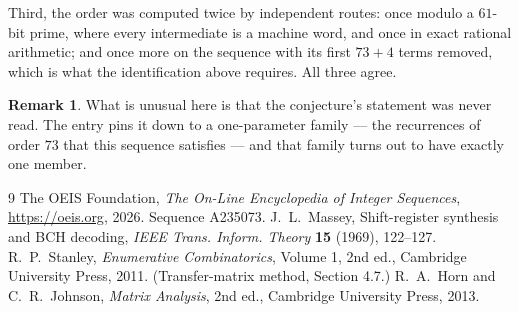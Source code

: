 \documentclass[11pt,a4paper]{article}
\theoremstyle{plain}
\theoremstyle{definition}
\newtheorem{remark}[theorem]{Remark}
\begin{document}
Third, the order was computed twice by independent routes: once modulo a $61$-bit prime, where
every intermediate is a machine word, and once in exact rational arithmetic; and once more on
the sequence with its first $73+4$ terms removed, which is what the identification above
requires. All three agree.

\begin{remark}
What is unusual here is that the conjecture's statement was never read. The entry pins it down
to a one-parameter family --- the recurrences of order $73$ that this sequence satisfies
--- and that family turns out to have exactly one member.
\end{remark}

\begin{thebibliography}{9}
 The OEIS Foundation, \emph{The On-Line Encyclopedia of Integer
Sequences}, \url{https://oeis.org}, 2026. Sequence A235073.
 J.~L.~Massey, Shift-register synthesis and BCH decoding, \emph{IEEE
Trans. Inform. Theory} \textbf{15} (1969), 122--127.
 R.~P.~Stanley, \emph{Enumerative Combinatorics}, Volume 1, 2nd ed.,
Cambridge University Press, 2011. (Transfer-matrix method, Section 4.7.)
 R.~A.~Horn and C.~R.~Johnson, \emph{Matrix Analysis}, 2nd ed., Cambridge
University Press, 2013.
\end{thebibliography}
\end{document}
